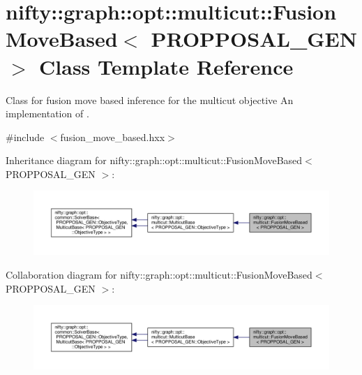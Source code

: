 \hypertarget{classnifty_1_1graph_1_1opt_1_1multicut_1_1FusionMoveBased}{}\section{nifty\+:\+:graph\+:\+:opt\+:\+:multicut\+:\+:Fusion\+Move\+Based$<$ P\+R\+O\+P\+P\+O\+S\+A\+L\+\_\+\+G\+EN $>$ Class Template Reference}
\label{classnifty_1_1graph_1_1opt_1_1multicut_1_1FusionMoveBased}


Class for fusion move based inference for the multicut objective An implementation of \cite{beier_15_funsion}.  




{\ttfamily \#include $<$fusion\+\_\+move\+\_\+based.\+hxx$>$}



Inheritance diagram for nifty\+:\+:graph\+:\+:opt\+:\+:multicut\+:\+:Fusion\+Move\+Based$<$ P\+R\+O\+P\+P\+O\+S\+A\+L\+\_\+\+G\+EN $>$\+:
\nopagebreak
\begin{figure}[H]
\begin{center}
\leavevmode
\includegraphics[width=350pt]{classnifty_1_1graph_1_1opt_1_1multicut_1_1FusionMoveBased__inherit__graph}
\end{center}
\end{figure}


Collaboration diagram for nifty\+:\+:graph\+:\+:opt\+:\+:multicut\+:\+:Fusion\+Move\+Based$<$ P\+R\+O\+P\+P\+O\+S\+A\+L\+\_\+\+G\+EN $>$\+:
\nopagebreak
\begin{figure}[H]
\begin{center}
\leavevmode
\includegraphics[width=350pt]{classnifty_1_1graph_1_1opt_1_1multicut_1_1FusionMoveBased__coll__graph}
\end{center}
\end{figure}

